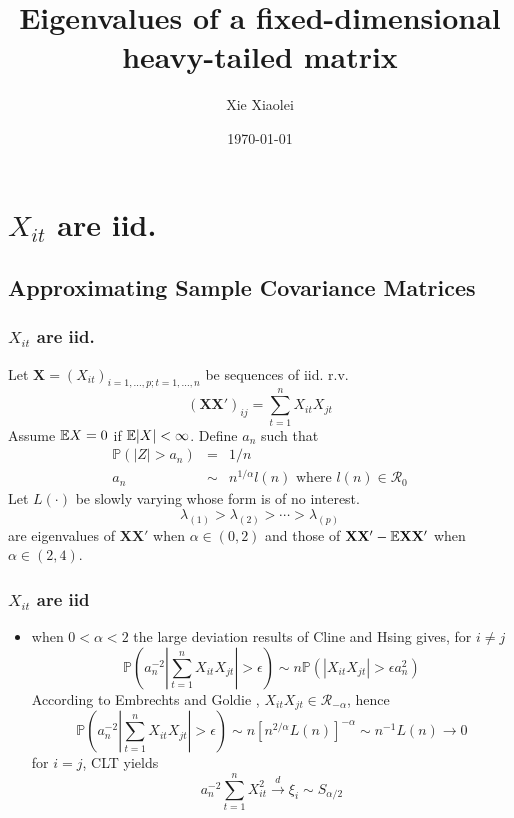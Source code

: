 \documentclass{beamer}
\title{Eigenvalues of a fixed-dimensional heavy-tailed matrix} %
\author{Xie Xiaolei} %
\institute[UCPH] %
{
Copenhagen University  \\ %
\medskip
\textit{xie.xiaolei@gmail.com} %
}
\date{\today} %
\renewcommand{\P}{
\mathbb P
}
\begin{document}
\begin{frame}
\titlepage %
\end{frame}


\section[iid data]{$X_{it}$ are iid.}
\subsection{Approximating Sample Covariance Matrices}
\begin{frame}
  \frametitle{$X_{it}$ are iid.}
  Let $\mathbf X = (X_{it})_{i=1,\dots,p; t = 1,\dots, n}$ be sequences of iid. r.v.
  \[
  (\mathbf{XX'})_{ij} = \sum_{t=1}^n X_{it}X_{jt}
  \]
  Assume $\mathbb{E} X = 0$ if $\mathbb{E} |X| < \infty$. Define $a_n$ such that
  \begin{eqnarray*}
    \P(|Z| > a_n) &=& 1/n  \\
    a_n &\sim& n^{1/\alpha} l(n) \text{ where } l(n) \in \mathcal R_{0}
  \end{eqnarray*}
  Let $L(\cdot)$ be slowly varying whose form is of no interest.
  \[
  \lambda_{(1)} > \lambda_{(2)} > \cdots > \lambda_{(p)}
  \]
  are eigenvalues of $\mathbf{XX'}$ when $\alpha \in (0, 2)$ and those of $\mathbf{XX'}
  - \mathbb{E} \mathbf{XX'}$ when $\alpha \in (2, 4)$.
\end{frame}

\begin{frame}
  \frametitle{$X_{it}$ are iid}
  \begin{itemize}
  \item when $0 < \alpha  < 2$ the large deviation results of Cline
    and Hsing \cite{ClingHsing1998} gives, for $i \neq j$
    \[
    \P(a_n^{-2} |\sum_{t=1}^n X_{it}X_{jt}| > \epsilon) \sim n
    \P(|X_{it}X_{jt}| > \epsilon a_n^2)
    \]
    According to Embrechts and Goldie \cite{Embrechts1982263},
    $X_{it}X_{jt} \in \mathcal R_{-\alpha}$, hence
    \[
    \P(a_n^{-2} |\sum_{t=1}^n X_{it}X_{jt}| > \epsilon) \sim n
    [n^{2/\alpha} L(n)]^{-\alpha} \sim n^{-1} L(n) \to 0
    \]
    for $i = j$, CLT yields
    \[
    a_n^{-2} \sum_{t=1}^n X_{it}^2 \overset{d}{\to} \xi_i \sim S_{\alpha/2}
    \]
  \end{itemize}
\end{frame}
\end{document}
